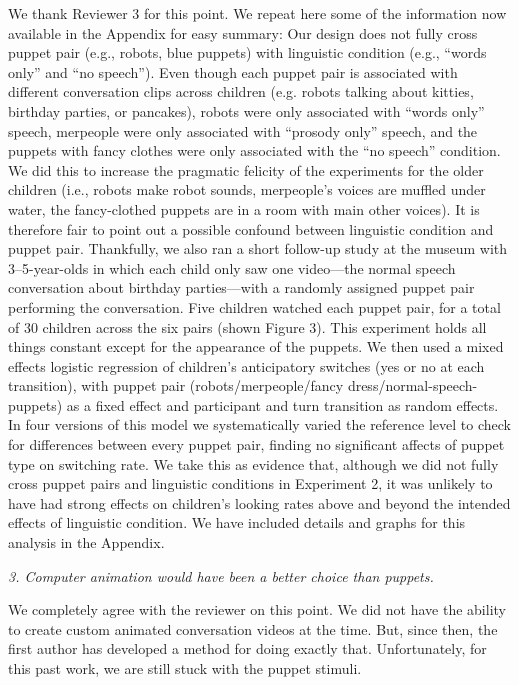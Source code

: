 \documentclass[11pt,a4paper]{letter} %
\begin{document}
\begin{letter}{}
\noindent We thank Reviewer 3 for this point. We repeat here some of the information now available in the Appendix for easy summary: Our design does not fully cross puppet pair (e.g., robots, blue puppets) with linguistic condition (e.g., ``words only'' and ``no speech''). Even though each puppet pair is associated with different conversation clips across children (e.g. robots talking about kitties, birthday parties, or pancakes), robots were only associated with ``words only'' speech, merpeople were only associated with ``prosody only'' speech, and the puppets with fancy clothes were only associated with the ``no speech'' condition. We did this to increase the pragmatic felicity of the experiments for the older children (i.e., robots make robot sounds, merpeople's voices are muffled under water, the fancy-clothed puppets are in a room with main other voices). It is therefore fair to point out a possible confound between linguistic condition and puppet pair. Thankfully, we also ran a short follow-up study at the museum with 3--5-year-olds in which each child only saw one video---the normal speech conversation about birthday parties---with a randomly assigned puppet pair performing the conversation. Five children watched each puppet pair, for a total of 30 children across the six pairs (shown Figure 3). This experiment holds all things constant except for the appearance of the puppets. We then used a mixed effects logistic regression of children's anticipatory switches (yes or no at each transition), with puppet pair (robots/merpeople/fancy dress/normal-speech-puppets) as a fixed effect and participant and turn transition as random effects. In four versions of this model we systematically varied the reference level to check for differences between every puppet pair, finding no significant affects of puppet type on switching rate. We take this as evidence that, although we did not fully cross puppet pairs and linguistic conditions in Experiment 2, it was unlikely to have had strong effects on children's looking rates above and beyond the intended effects of linguistic condition. We have included details and graphs for this analysis in the Appendix. 

\smallskip

\noindent \textit{3. Computer animation would have been a better choice than puppets.}

\noindent We completely agree with the reviewer on this point. We did not have the ability to create custom animated conversation videos at the time. But, since then, the first author has developed a method for doing exactly that. Unfortunately, for this past work, we are still stuck with the puppet stimuli.


\end{letter}
\end{document}
